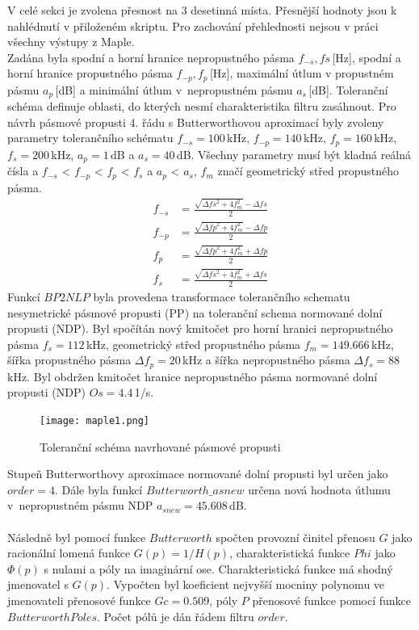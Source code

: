 V celé sekci je zvolena přesnost na 3 desetinná místa. Přesnější hodnoty jsou k nahlédnutí v přiloženém skriptu. Pro zachování přehlednosti nejsou v práci všechny výstupy z Maple.\\
Zadána byla spodní a horní hranice nepropustného pásma $f_{-s},fs$\,[Hz], spodní a horní hranice propustného pásma $f_{-p},f_p$\,[Hz], maximální útlum v propustném pásmu $a_p$\,[dB] a minimální útlum v~nepropustném pásmu $a_s$\,[dB]. Toleranční schéma definuje oblasti, do kterých nesmí charakteristika filtru zasáhnout. Pro návrh pásmové propusti 4. řádu s Butterworthovou aproximací byly zvoleny parametry tolerančního schématu $f_{-s} = 100$\,kHz, $f_{-p} = 140$\,kHz, $f_p = 160$\,kHz, $f_s = 200$\,kHz, $a_p = 1$\,dB a $a_s = 40$\,dB. Všechny parametry musí být kladná reálná čísla a $f_{-s}$ <  $f_{-p}$ < $f_p$ < $f_s$ a $a_p$ < $a_s$, $f_m$ značí geometrický střed propustného pásma.
\begin{align}
f_{-s} &= \frac{\sqrt{\Delta{fs}^2+4f_m ^2}-\Delta{fs}}{2}\\
f_{-p} &= \frac{\sqrt{\Delta{fp}^2+4f_m ^2}-\Delta{fp}}{2}\\
f_p &= \frac{\sqrt{\Delta{fp}^2+4f_m ^2}+\Delta{fp}}{2}\\
f_s &= \frac{\sqrt{\Delta{fs}^2+4f_m ^2}+\Delta{fs}}{2}
\end{align}
Funkcí $BP2NLP$ byla provedena transformace tolerančního schematu nesymetrické pásmové propusti (PP) na toleranční schema normované dolní propusti (NDP). Byl spočítán nový kmitočet pro horní hranici nepropustného pásma $f_s = 112$\,kHz, geometrický střed propustného pásma $f_m = 149.666$\,kHz, šířka propustného pásma $\Delta{f_p} = 20$\,kHz a šířka nepropustného pásma $\Delta{f_s} = 88$\,kHz. Byl obdržen kmitočet hranice nepropustného pásma normované dolní propusti (NDP) $Os = 4.4$\,1/s.
\begin{figure}[h]
\centering
\texttt{[image: maple1.png]}
\caption{Toleranční schéma navrhované pásmové propusti}
\end{figure}
\noindent Stupeň Butterworthovy aproximace normované dolní propusti byl určen jako $order = 4$.
\noindent Dále byla funkcí $Butterworth\_asnew$ určena nová hodnota útlumu v~nepropustném pásmu NDP $a_{snew} = 45.608$\,dB.\\
\\
Následně byl pomocí funkce $Butterworth$ spočten provozní činitel přenosu $G$ jako racionální lomená funkce $G(p) = 1/H(p)$, charakteristická funkce $Phi$ jako $\Phi(p)$ s nulami a póly na imaginární ose. Charakteristická funkce má shodný jmenovatel s $G(p)$. Vypočten byl koeficient nejvyšší mocniny polynomu ve jmenovateli přenosové funkce $Gc = 0.509$, póly $P$ přenosové funkce pomocí funkce $ButterworthPoles$. Počet pólů je dán řádem filtru $order$.
